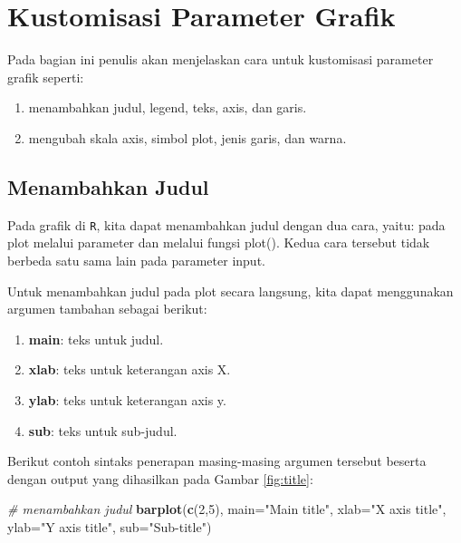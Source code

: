 \documentclass[
]{book}
\newenvironment{Shaded}{\begin{snugshade}}{\end{snugshade}}
\newcommand{\AttributeTok}[1]{\textcolor[rgb]{0.13,0.29,0.53}{#1}}
\newcommand{\CommentTok}[1]{\textcolor[rgb]{0.56,0.35,0.01}{\textit{#1}}}
\newcommand{\DecValTok}[1]{\textcolor[rgb]{0.00,0.00,0.81}{#1}}
\newcommand{\FunctionTok}[1]{\textcolor[rgb]{0.13,0.29,0.53}{\textbf{#1}}}
\newcommand{\NormalTok}[1]{#1}
\newcommand{\StringTok}[1]{\textcolor[rgb]{0.31,0.60,0.02}{#1}}
\providecommand{\tightlist}{%
  \setlength{\itemsep}{0pt}\setlength{\parskip}{0pt}}
\theoremstyle{definition}
\theoremstyle{definition}
\theoremstyle{definition}
\theoremstyle{definition}
\theoremstyle{remark}
\begin{document}
\hypertarget{customise}{%
\section{Kustomisasi Parameter Grafik}\label{customise}}

Pada bagian ini penulis akan menjelaskan cara untuk kustomisasi parameter grafik seperti:

\begin{enumerate}
\def\labelenumi{\alph{enumi}.}
\tightlist
\item
  menambahkan judul, legend, teks, axis, dan garis.
\item
  mengubah skala axis, simbol plot, jenis garis, dan warna.
\end{enumerate}

\hypertarget{addtitle}{%
\subsection{Menambahkan Judul}\label{addtitle}}

Pada grafik di \texttt{R}, kita dapat menambahkan judul dengan dua cara, yaitu: pada plot melalui parameter dan melalui fungsi plot(). Kedua cara tersebut tidak berbeda satu sama lain pada parameter input.

Untuk menambahkan judul pada plot secara langsung, kita dapat menggunakan argumen tambahan sebagai berikut:

\begin{enumerate}
\def\labelenumi{\alph{enumi}.}
\tightlist
\item
  \textbf{main}: teks untuk judul.
\item
  \textbf{xlab}: teks untuk keterangan axis X.
\item
  \textbf{ylab}: teks untuk keterangan axis y.
\item
  \textbf{sub}: teks untuk sub-judul.
\end{enumerate}

Berikut contoh sintaks penerapan masing-masing argumen tersebut beserta dengan output yang dihasilkan pada Gambar \ref{fig:title}:

\begin{Shaded}
\begin{Highlighting}[]
\CommentTok{\# menambahkan judul}
\FunctionTok{barplot}\NormalTok{(}\FunctionTok{c}\NormalTok{(}\DecValTok{2}\NormalTok{,}\DecValTok{5}\NormalTok{), }\AttributeTok{main=}\StringTok{"Main title"}\NormalTok{,}
        \AttributeTok{xlab=}\StringTok{"X axis title"}\NormalTok{,}
        \AttributeTok{ylab=}\StringTok{"Y axis title"}\NormalTok{,}
        \AttributeTok{sub=}\StringTok{"Sub{-}title"}\NormalTok{)}
\end{Highlighting}
\end{Shaded}
\end{document}
